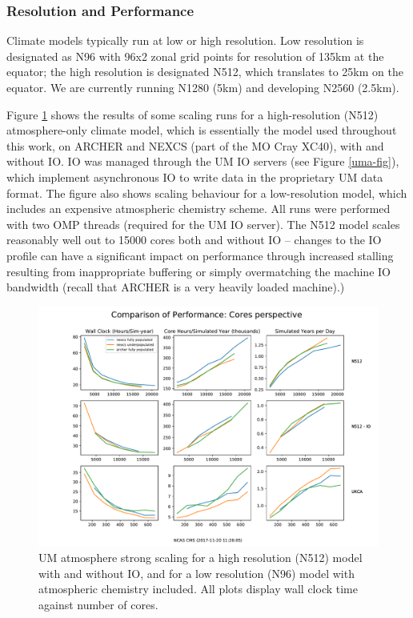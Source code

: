 \documentclass[twocolumn, 5p, times]{elsarticle}
\begin{document}
\subsubsection{Resolution and Performance}
Climate models typically run at low or high resolution. Low resolution is designated as N96 with 96x2 zonal grid points for resolution of 135km at the equator; the high resolution is designated N512, which translates to 25km on the equator. We are currently running N1280 (5km) and developing N2560 (2.5km).

Figure \ref{scaling-um-fig} shows the results of some scaling runs for a high-resolution (N512) atmosphere-only climate model, which is essentially the model used throughout this work, on ARCHER and NEXCS (part of the MO Cray XC40), with and without IO. IO was managed through the UM IO servers (see Figure \ref{uma-fig}), which implement asynchronous IO to write data in the proprietary UM data format. The figure also shows scaling behaviour for a low-resolution model, which includes an expensive atmospheric chemistry scheme. All runs were performed with two OMP threads (required for the UM IO server). The N512 model scales reasonably well out to 15000 cores both and without IO -- changes to the IO profile can have a significant impact on performance through increased stalling resulting from inappropriate buffering or simply overmatching the machine IO bandwidth (recall that ARCHER is a very heavily loaded machine).) 


\begin{figure}
        \includegraphics[width=\columnwidth]{figures/Cores.pdf}
        \caption{UM atmosphere strong scaling for a high resolution (N512) model with and without IO, and for a low resolution (N96) model with atmospheric chemistry included. All plots display wall clock time against number of cores.}
        \label{scaling-um-fig} 
\end{figure}
\end{document}

